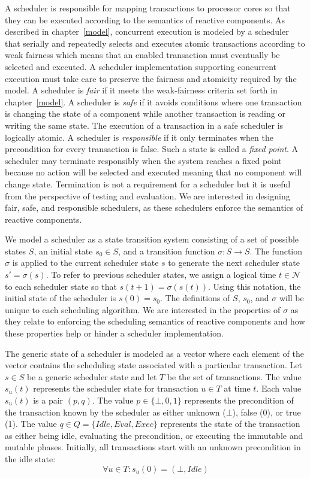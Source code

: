 A scheduler is responsible for mapping transactions to processor cores so that they can be executed according to the semantics of reactive components.
As described in chapter~\ref{model}, concurrent execution is modeled by a scheduler that serially and repeatedly selects and executes atomic transactions according to weak fairness which means that an enabled transaction must eventually be selected and executed.
A scheduler implementation supporting concurrent execution must take care to preserve the fairness and atomicity required by the model.
A scheduler is \emph{fair} if it meets the weak-fairness criteria set forth in chapter~\ref{model}.
A scheduler is \emph{safe} if it avoids conditions where one transaction is changing the state of a component while another transaction is reading or writing the same state.
The execution of a transaction in a safe scheduler is logically atomic.
A scheduler is \emph{responsible} if it only terminates when the precondition for every transaction is false.
Such a state is called a \emph{fixed point}.
A scheduler may terminate responsibly when the system reaches a fixed point because no action will be selected and executed meaning that no component will change state.
Termination is not a requirement for a scheduler but it is useful from the perspective of testing and evaluation.
We are interested in designing fair, safe, and responsible schedulers, as these schedulers enforce the semantics of reactive components.

We model a scheduler as a state transition system consisting of a set of possible states $S$, an initial state $s_0 \in S$, and a transition function $\sigma: S \to S$.
The function $\sigma$ is applied to the current scheduler state $s$ to generate the next scheduler state $s' = \sigma (s)$.
To refer to previous scheduler states, we assign a logical time $t \in \mathcal{N}$ to each scheduler state so that $s(t + 1) = \sigma (s(t))$.
Using this notation, the initial state of the scheduler is $s(0) = s_0$.
The definitions of $S$, $s_0$, and $\sigma$ will be unique to each scheduling algorithm.
We are interested in the properties of $\sigma$ as they relate to enforcing the scheduling semantics of reactive components and how these properties help or hinder a scheduler implementation.

The generic state of a scheduler is modeled as a vector where each element of the vector contains the scheduling state associated with a particular transaction.
Let $s \in S$ be a generic scheduler state and let $T$ be the set of transactions.
The value $s_u(t)$ represents the scheduler state for transaction $u \in T$ at time $t$.
Each value $s_u(t)$ is a pair $(p, q)$.
The value $p \in \{\bot, 0, 1\}$ represents the precondition of the transaction known by the scheduler as either unknown ($\bot$), false (0), or true (1).
The value $q \in Q = \{\mathit{Idle}, \mathit{Eval}, \mathit{Exec}\}$ represents the state of the transaction as either being idle, evaluating the precondition, or executing the immutable and mutable phases.
Initially, all transactions start with an unknown precondition in the idle state:
\begin{equation}
  \forall u \in T : s_u(0) = (\bot, \mathit{Idle})
\end{equation}


